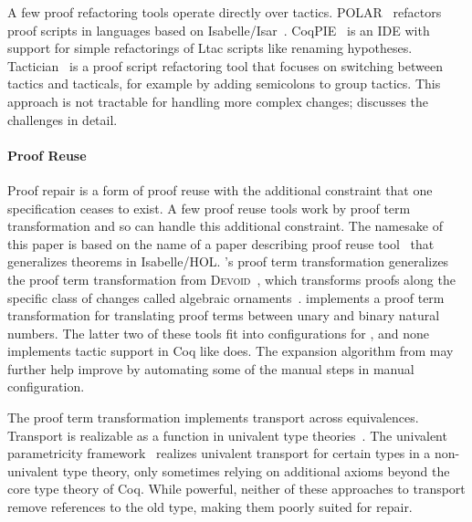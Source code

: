 A few proof refactoring tools operate directly over tactics.
POLAR~\cite{Dietrich2013} refactors proof scripts in languages based on Isabelle/Isar~\cite{Wenzel2007isar}.
CoqPIE~\cite{Roe2016} is an IDE with support for simple refactorings of Ltac scripts like renaming hypotheses.
Tactician~\cite{adams2015} is a proof script refactoring tool that focuses on switching between tactics and tacticals,
for example by adding semicolons to group tactics.
This approach is not tractable for handling more complex changes;
\citet{robert2018} discusses the challenges in detail.

\paragraph{Proof Reuse}

Proof repair is a form of proof reuse with the additional constraint that one specification ceases to exist.
A few proof reuse tools work by proof term transformation and so can handle this additional constraint.
The namesake of this paper is based on the name of a paper describing proof reuse tool~\cite{Johnsen2004}
that generalizes theorems in Isabelle/HOL.
\toolname's proof term transformation generalizes the proof term transformation from \textsc{Devoid}~\cite{Ringer2019},
which transforms proofs along the specific class of changes called algebraic ornaments~\cite{mcbride}.
\citet{magaud2000changing} implements a proof term transformation for translating proof terms between
unary and binary natural numbers. 
The latter two of these tools fit into configurations for \toolname,
and none implements tactic support in Coq like \toolname does.
The expansion algorithm from \citet{magaud2000changing} may further help improve \toolname
by automating some of the manual steps in manual configuration.

The \toolname proof term transformation implements transport across equivalences.
Transport is realizable as a function in univalent type theories~\cite{univalent2013homotopy}.
The univalent parametricity framework~\cite{tabareau2017equivalences} realizes univalent transport for certain types
in a non-univalent type theory, only sometimes relying on additional axioms beyond the core type theory of Coq.
While powerful, neither of these approaches to transport remove references to the old type, making them poorly suited for repair.


